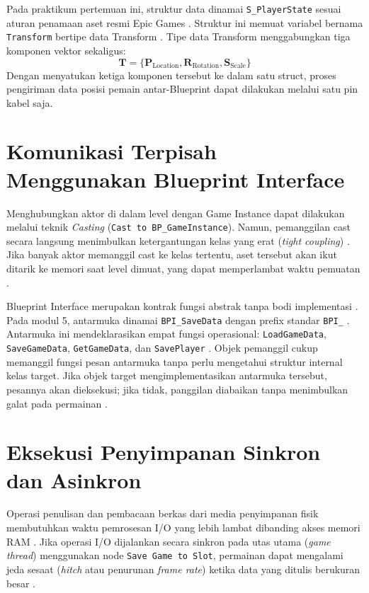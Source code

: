 \documentclass[a4paper,oneside,12pt]{report}
\begin{document}
Pada praktikum pertemuan ini, struktur data dinamai \texttt{S\_PlayerState} sesuai aturan penamaan aset resmi Epic Games \cite{epic-naming}. Struktur ini memuat variabel bernama \texttt{Transform} bertipe data Transform \cite{modul5}. Tipe data Transform menggabungkan tiga komponen vektor sekaligus:
\begin{equation}
\mathbf{T} = \{\mathbf{P}_{\text{Location}}, \mathbf{R}_{\text{Rotation}}, \mathbf{S}_{\text{Scale}}\}
\end{equation}
Dengan menyatukan ketiga komponen tersebut ke dalam satu struct, proses pengiriman data posisi pemain antar-Blueprint dapat dilakukan melalui satu pin kabel saja.

\section{Komunikasi Terpisah Menggunakan Blueprint Interface}
Menghubungkan aktor di dalam level dengan Game Instance dapat dilakukan melalui teknik \textit{Casting} (\texttt{Cast to BP\_GameInstance}). Namun, pemanggilan cast secara langsung menimbulkan ketergantungan kelas yang erat (\textit{tight coupling}) \cite{epic-interface}. Jika banyak aktor memanggil cast ke kelas tertentu, aset tersebut akan ikut ditarik ke memori saat level dimuat, yang dapat memperlambat waktu pemuatan \cite{modul5}.

Blueprint Interface merupakan kontrak fungsi abstrak tanpa bodi implementasi \cite{epic-interface}. Pada modul 5, antarmuka dinamai \texttt{BPI\_SaveData} dengan prefix standar \texttt{BPI\_} \cite{epic-naming}. Antarmuka ini mendeklarasikan empat fungsi operasional: \texttt{LoadGameData}, \texttt{SaveGameData}, \texttt{GetGameData}, dan \texttt{SavePlayer} \cite{modul5}. Objek pemanggil cukup memanggil fungsi pesan antarmuka tanpa perlu mengetahui struktur internal kelas target. Jika objek target mengimplementasikan antarmuka tersebut, pesannya akan dieksekusi; jika tidak, panggilan diabaikan tanpa menimbulkan galat pada permainan \cite{epic-interface}.

\section{Eksekusi Penyimpanan Sinkron dan Asinkron}
Operasi penulisan dan pembacaan berkas dari media penyimpanan fisik membutuhkan waktu pemrosesan I/O yang lebih lambat dibanding akses memori RAM \cite{epic-async}. Jika operasi I/O dijalankan secara sinkron pada utas utama (\textit{game thread}) menggunakan node \texttt{Save Game to Slot}, permainan dapat mengalami jeda sesaat (\textit{hitch} atau penurunan \textit{frame rate}) ketika data yang ditulis berukuran besar \cite{epic-savegame}.
\end{document}
